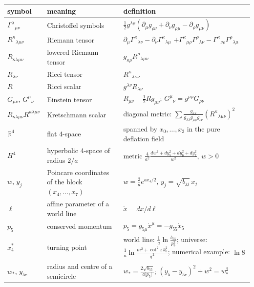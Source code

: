 \documentclass[10pt]{article}
\begin{document}
{\small\begin{longtable}{>{\raggedright\arraybackslash}p{}>{\raggedright\arraybackslash}p{}>{\raggedright\arraybackslash}p{}}\toprule
symbol & meaning & definition \\\midrule\endhead
\bottomrule\endfoot
$\Gamma^\lambda{}_{\mu\nu}$ & Christoffel symbols & $\frac12g^{\lambda\rho}(\partial_\mu g_{\rho\nu} + \partial_\nu g_{\rho\mu} - \partial_\rho g_{\mu\nu})$ \\
$R^\kappa{}_{\lambda\mu\nu}$ & Riemann tensor & $\partial_\mu\Gamma^\kappa{}_{\lambda\nu} - \partial_\nu\Gamma^\kappa{}_{\lambda\mu}$ $+ \Gamma^\kappa{}_{\mu\rho}\Gamma^\rho{}_{\lambda\nu} - \Gamma^\kappa{}_{\nu\rho}\Gamma^\rho{}_{\lambda\mu}$ \\
$R_{\kappa\lambda\mu\nu}$ & lowered Riemann tensor & $g_{\kappa\rho}R^\rho{}_{\lambda\mu\nu}$ \\
$R_{\lambda\nu}$ & Ricci tensor & $R^\kappa{}_{\lambda\kappa\nu}$ \\
$R$ & Ricci scalar & $g^{\lambda\nu}R_{\lambda\nu}$ \\
$G_{\mu\nu}$, $G^\mu{}_\nu$ & Einstein tensor & $R_{\mu\nu} - \frac12Rg_{\mu\nu}$; $G^\mu{}_\nu = g^{\mu\rho}G_{\rho\nu}$ \\
$R_{\kappa\lambda\mu\nu}R^{\kappa\lambda\mu\nu}$ & Kretschmann scalar & diagonal metric: $\sum\frac{g_{\kappa\kappa}}{g_{\lambda\lambda}g_{\mu\mu}g_{\nu\nu}}(R^\kappa{}_{\lambda\mu\nu})^2$ \\
$\mathbb R^4$ & flat 4-space & spanned by $x_0, \dots, x_3$ in the pure deflation field \\
$H^4$ & hyperbolic 4-space of radius $2/a$ & metric $\frac{4}{a^2}\frac{dw^2 + dy_5^2 + dy_6^2 + dy_7^2}{w^2}$, $w > 0$ \\
$w$, $y_j$ & Poincare coordinates of the block $(x_4, \dots, x_7)$ & $w = \frac2ae^{ax_4/2}$, $y_j = \sqrt{b_{jj}}\,x_j$ \\
$\ell$ & affine parameter of a world line & $\dot x = dx/d\ell$ \\
$p_5$ & conserved momentum & $p_5 = g_{5\mu}\dot x^\mu = -g_{55}\dot x_5$ \\
$x_4^*$ & turning point & world line: $\frac1a\ln\frac{b_{55}}{p_5^2}$; universe: $\frac1a\ln\frac{m^2 + \cot^2 z\,k_0^2}{\bar q^{\,2}}$; numerical example: $\ln 8$ \\
$w_*$, $y_{5c}$ & radius and centre of a semicircle & $w_* = \frac{2\sqrt{b_{55}}}{a\lvert p_5\rvert}$; $(y_5 - y_{5c})^2 + w^2 = w_*^2$ \\
\end{longtable}}
\end{document}
